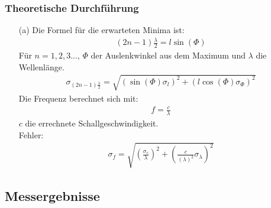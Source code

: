 \documentclass[12pt]{scrartcl}
\begin{document}
\subsubsection{Theoretische Durchführung}
\begin{enumerate}
\item[(a)]
Die Formel für die erwarteten Minima ist:
\begin{align}
(2n-1)\frac{\lambda}{2} = l \sin(\Phi)
\label{eqn:lambda_3}
\end{align}
Für $n = 1,2,3...$, $\Phi$ der Auslenkwinkel aus dem Maximum und $\lambda$ die Wellenlänge.\\
\begin{align}
\sigma_{(2n-1)\frac{\lambda}{2}} = \sqrt{
\left(\sin(\Phi)\sigma_l\right)^2+
\left(l \cos(\Phi)\sigma_{\Phi}\right)^2}
\label{eqn:lambda_3_sigma}
\end{align}
Die Frequenz berechnet sich mit:
\begin{align}
f = \frac{c}{\lambda} 
\label{eqn:freq}
\end{align}
$c$ die errechnete Schallgeschwindigkeit.\\
Fehler:
\begin{align}
\sigma_f = \sqrt{
\left(\frac{\sigma_{c}}{\lambda}\right)^2+
\left(\frac{c}{(\lambda)^2}\sigma_{\lambda}\right)^2}
\label{eqn:freq_sigma}
\end{align}
\end{enumerate}
\subsection{Messergebnisse}
\end{document}
